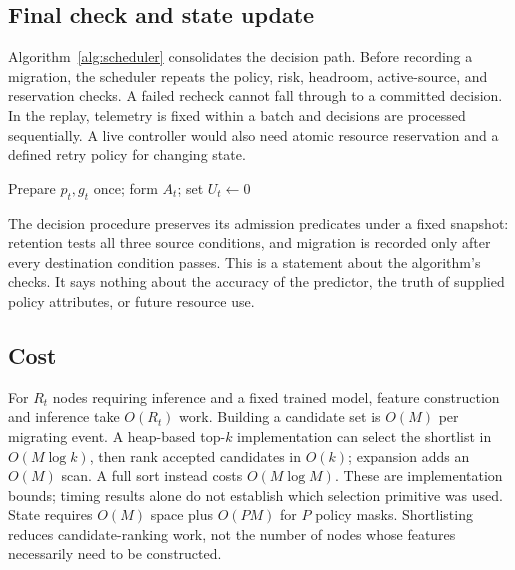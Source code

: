 \subsection{Final check and state update}
Algorithm~\ref{alg:scheduler} consolidates the decision path. Before
recording a migration, the scheduler repeats the policy, risk, headroom,
active-source, and reservation checks. A failed recheck cannot fall through
to a committed decision. In the replay, telemetry is fixed within a batch
and decisions are processed sequentially. A live controller would also need
atomic resource reservation and a defined retry policy for changing state.

\begin{algorithm}[t]
\caption{Placement decisions for one timestamp}\label{alg:scheduler}
Prepare $p_t,g_t$ once; form $A_t$; set $U_t\leftarrow0$\;
\Return{$\pi$}\;
\end{algorithm}

The decision procedure preserves its admission predicates under a fixed
snapshot: retention tests all three source conditions, and migration is
recorded only after every destination condition passes. This is a statement
about the algorithm's checks. It says nothing about the accuracy of the
predictor, the truth of supplied policy attributes, or future resource use.

\subsection{Cost}
For $R_t$ nodes requiring inference and a fixed trained model, feature
construction and inference take $O(R_t)$ work. Building a candidate set is
$O(M)$ per migrating event. A heap-based top-$k$ implementation can select
the shortlist in $O(M\log k)$, then rank accepted candidates in $O(k)$;
expansion adds an $O(M)$ scan. A full sort instead costs $O(M\log M)$.
These are implementation bounds; timing results alone do not establish
which selection primitive was used. State requires $O(M)$ space plus $O(PM)$ for $P$ policy masks.
Shortlisting reduces candidate-ranking work, not the number of nodes whose
features necessarily need to be constructed.
